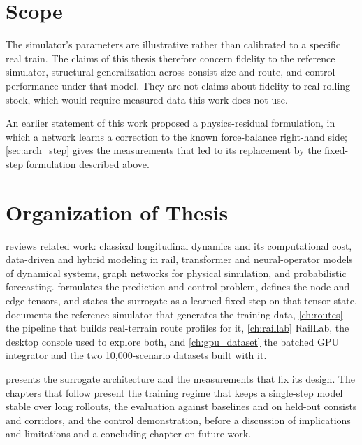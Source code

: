 
\section{Scope}

The simulator's parameters are illustrative rather than calibrated to a specific real train. The claims of this thesis therefore concern fidelity to the reference simulator, structural generalization across consist size and route, and control performance under that model. They are not claims about fidelity to real rolling stock, which would require measured data this work does not use.

An earlier statement of this work \cite{james2027trb} proposed a physics-residual formulation, in which a network learns a correction to the known force-balance right-hand side; \cref{sec:arch_step} gives the measurements that led to its replacement by the fixed-step formulation described above.

\section{Organization of Thesis}

 reviews related work: classical longitudinal dynamics and its computational cost, data-driven and hybrid modeling in rail, transformer and neural-operator models of dynamical systems, graph networks for physical simulation, and probabilistic forecasting.  formulates the prediction and control problem, defines the node and edge tensors, and states the surrogate as a learned fixed step on that tensor state.  documents the reference simulator that generates the training data, \cref{ch:routes} the pipeline that builds real-terrain route profiles for it, \cref{ch:raillab} RailLab, the desktop console used to explore both, and \cref{ch:gpu_dataset} the batched GPU integrator and the two 10,000-scenario datasets built with it.

 presents the surrogate architecture and the measurements that fix its design. The chapters that follow present the training regime that keeps a single-step model stable over long rollouts, the evaluation against baselines and on held-out consists and corridors, and the control demonstration, before a discussion of implications and limitations and a concluding chapter on future work.
